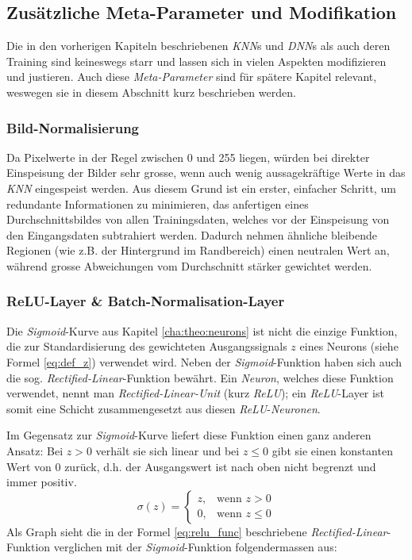 \subsection{Zusätzliche Meta-Parameter und Modifikation}\label{cha:theo:mod}
Die in den vorherigen Kapiteln beschriebenen \textit{KNN}s und \textit{DNN}s als auch deren Training sind keineswegs starr und lassen sich in vielen Aspekten modifizieren und justieren. Auch diese \textit{Meta-Parameter} sind für spätere Kapitel relevant, weswegen sie in diesem Abschnitt kurz beschrieben werden. 

\subsubsection{Bild-Normalisierung}
Da Pixelwerte in der Regel zwischen 0 und 255 liegen, würden bei direkter Einspeisung der Bilder sehr grosse, wenn auch wenig aussagekräftige Werte in das \textit{KNN} eingespeist werden. Aus diesem Grund ist ein erster, einfacher Schritt, um redundante Informationen zu minimieren, das anfertigen eines Durchschnittsbildes von allen Trainingsdaten, welches vor der Einspeisung von den Eingangsdaten subtrahiert werden. Dadurch nehmen ähnliche bleibende Regionen (wie z.B. der Hintergrund im Randbereich) einen neutralen Wert an, während grosse Abweichungen vom Durchschnitt stärker gewichtet werden\cite{zerocenter}.

\subsubsection{ReLU-Layer \& Batch-Normalisation-Layer}\label{cha:theo:relu}
Die \textit{Sigmoid}-Kurve aus Kapitel \ref{cha:theo:neurons} ist nicht die einzige Funktion, die zur Standardisierung des gewichteten Ausgangssignals $z$ eines Neurons (siehe Formel \ref{eq:def_z}) verwendet wird. Neben der \textit{Sigmoid}-Funktion haben sich auch die sog. \textit{Rectified-Linear}-Funktion bewährt. Ein \textit{Neuron}, welches diese Funktion verwendet, nennt man \textit{Rectified-Linear-Unit} (kurz \textit{ReLU}); ein \textit{ReLU}-Layer ist somit eine Schicht zusammengesetzt aus diesen \textit{ReLU}-\textit{Neuronen}.

Im Gegensatz zur \textit{Sigmoid}-Kurve liefert diese Funktion einen ganz anderen Ansatz: Bei $z > 0$ verhält sie sich linear und bei $z \leq 0$ gibt sie einen konstanten Wert von 0 zurück, d.h. der Ausgangswert ist nach oben nicht begrenzt und immer positiv.
\begin{equation}\label{eq:relu_func}
	\sigma(z) = \begin{cases} z, & \mbox{wenn } z > 0 \\ 0, & \mbox{wenn } z \leq 0 \end{cases}
\end{equation}
Als Graph sieht die in der Formel \ref{eq:relu_func} beschriebene \textit{Rectified-Linear}-Funktion verglichen mit der \textit{Sigmoid}-Funktion folgendermassen aus:

